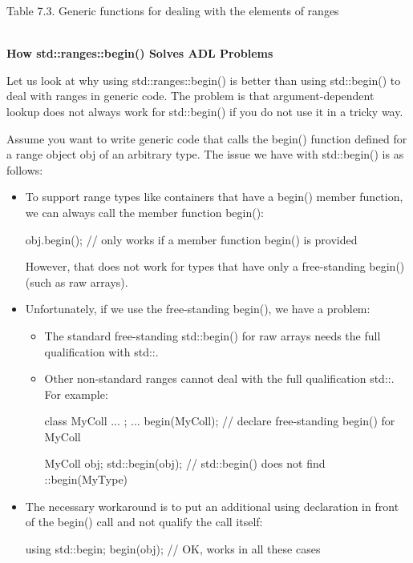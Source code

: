 \begin{center}
Table 7.3. Generic functions for dealing with the elements of ranges
\end{center}

\noindent
\hspace*{\fill} \\ %
\textbf{How std::ranges::begin() Solves ADL Problems}

Let us look at why using std::ranges::begin() is better than using std::begin() to deal with ranges in generic code. The problem is that argument-dependent lookup does not always work for std::begin() if you do not use it in a tricky way.

Assume you want to write generic code that calls the begin() function defined for a range object obj of an arbitrary type. The issue we have with std::begin() is as follows:

\begin{itemize}
\item
To support range types like containers that have a begin() member function, we can always call the member function begin():

\begin{cpp}
obj.begin(); // only works if a member function begin() is provided
\end{cpp}

However, that does not work for types that have only a free-standing begin() (such as raw arrays).

\item
Unfortunately, if we use the free-standing begin(), we have a problem:

\begin{itemize}
\item
The standard free-standing std::begin() for raw arrays needs the full qualification with std::.

\item
Other non-standard ranges cannot deal with the full qualification std::. For example:

\begin{cpp}
class MyColl {
	...
};
... begin(MyColl); // declare free-standing begin() for MyColl

MyColl obj;
std::begin(obj); // std::begin() does not find ::begin(MyType)
\end{cpp}
\end{itemize}

\item
The necessary workaround is to put an additional using declaration in front of the begin() call and not qualify the call itself:

\begin{cpp}
using std::begin;
begin(obj); // OK, works in all these cases
\end{cpp}
\end{itemize}

